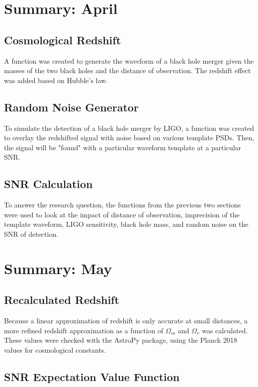 \documentclass[10pt]{article}
\begin{document}
\begin{multicols*}{2}
\section{Summary: April}

\subsection{Cosmological Redshift}

A function was created to generate the waveform of a black hole merger given the masses of the two black holes and the distance of observation. The redshift effect was added based on Hubble's law. 

\subsection{Random Noise Generator}

To simulate the detection of a black hole merger by LIGO, a function was created to overlay the redshifted signal with noise based on various template PSDs. Then, the signal will be "found" with a particular waveform template at a particular SNR. 

\subsection{SNR Calculation}

To answer the research question, the functions from the previous two sections were used to look at the impact of distance of observation, imprecision of the template waveform, LIGO sensitivity, black hole mass, and random noise on the SNR of detection. 

\section{Summary: May}

\subsection{Recalculated Redshift}

Because a linear approximation of redshift is only accurate at small distances, a more refined redshift approximation as a function of $\Omega_m$ and $\Omega_v$ was calculated. These values were checked with the AstroPy package, using the Planck 2018 values for cosmological constants. 

\subsection{SNR Expectation Value Function}


\end{multicols*}
\end{document}
